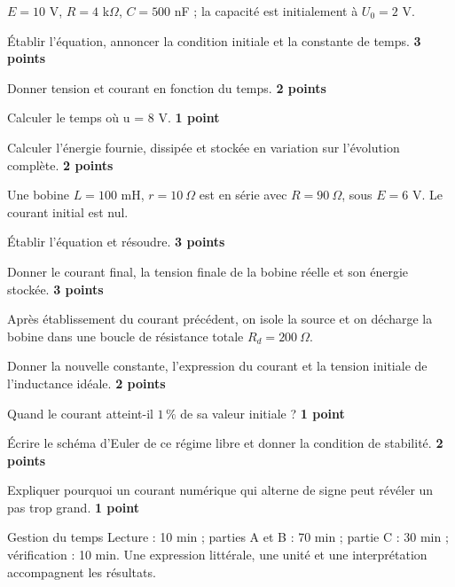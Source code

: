 $E=10$ V, $R=4$ k$\Omega$, $C=500$ nF ; la capacité est initialement à $U_0=2$ V.
\begin{questions}
\item Établir l’équation, annoncer la condition initiale et la constante de temps. \textbf{3 points}
\item Donner tension et courant en fonction du temps. \textbf{2 points}
\item Calculer le temps où u = 8 V. \textbf{1 point}
\item Calculer l’énergie fournie, dissipée et stockée en variation sur l’évolution complète. \textbf{2 points}
\end{questions}
Une bobine $L=100$ mH, $r=10\ \Omega$ est en série avec $R=90\ \Omega$, sous $E=6$ V. Le courant initial est nul.
\begin{questions}
\item Établir l’équation et résoudre. \textbf{3 points}
\item Donner le courant final, la tension finale de la bobine réelle et son énergie stockée. \textbf{3 points}
\end{questions}


Après établissement du courant précédent, on isole la source et on décharge la bobine dans une boucle de résistance totale $R_d=200\ \Omega$.
\begin{questions}
\item Donner la nouvelle constante, l’expression du courant et la tension initiale de l’inductance idéale. \textbf{2 points}
\item Quand le courant atteint-il $1\,\%$ de sa valeur initiale ? \textbf{1 point}
\item Écrire le schéma d’Euler de ce régime libre et donner la condition de stabilité. \textbf{2 points}
\item Expliquer pourquoi un courant numérique qui alterne de signe peut révéler un pas trop grand. \textbf{1 point}
\end{questions}
\begin{docu}{Gestion du temps}
Lecture : 10 min ; parties A et B : 70 min ; partie C : 30 min ; vérification : 10 min. Une expression littérale, une unité et une interprétation accompagnent les résultats.
\end{docu}


